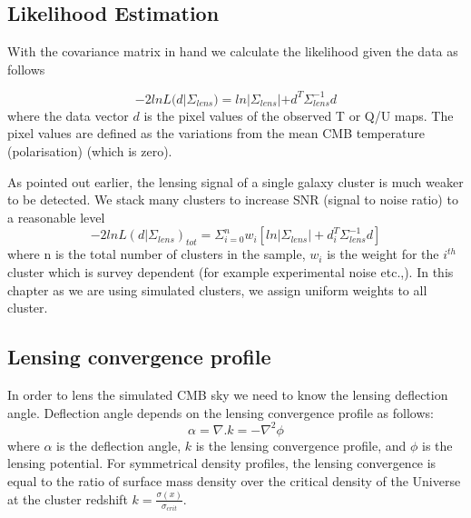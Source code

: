    
  
  \subsection{Likelihood Estimation}
  With the covariance matrix in hand we calculate the likelihood given the data as follows 
  
  \begin{equation}
  -2lnL(d|\Sigma_{lens}) = ln |\Sigma_{lens}| + d^{T} \Sigma^{-1}_{lens} d
  \end{equation}
  where the data vector $d$ is the pixel values of the observed T or Q/U maps.
  The pixel values are defined as the variations from the mean CMB temperature (polarisation) (which is zero).
  
  As pointed out earlier, the lensing signal of a single galaxy cluster is much weaker to be detected. 
  We stack many clusters to increase SNR (signal to noise ratio) to a reasonable level
  \begin{equation}
  -2ln L(d| \Sigma_{lens})_{tot} = \Sigma^{n}_{i =0} w_{i} [ln |\Sigma_{lens}| + d^{T}_{i} \Sigma^{-1}_{lens}  d]
  \end{equation}
  where n is the total number of clusters in the sample, $w_{i}$ is the weight for the $i^{th}$ cluster which is survey dependent (for example experimental noise etc.,).
  In this chapter as we are using simulated clusters, we assign uniform weights to all cluster.  

  \subsection{Lensing convergence profile}
  In order to lens the simulated CMB sky we need to know the lensing deflection angle.
  Deflection angle depends on the lensing convergence profile as follows:
\begin{equation}
 \alpha = \nabla. k = -\nabla^{2} \phi
 \end{equation}
 where $\alpha$ is the deflection angle, $k$ is the lensing convergence profile, and $\phi$ is the lensing potential.
 For symmetrical density profiles, the lensing convergence is equal to the ratio of surface mass density over the critical density of the Universe at the cluster redshift $k = \frac{\sigma(x)}{\sigma_{crit}}$.
 
